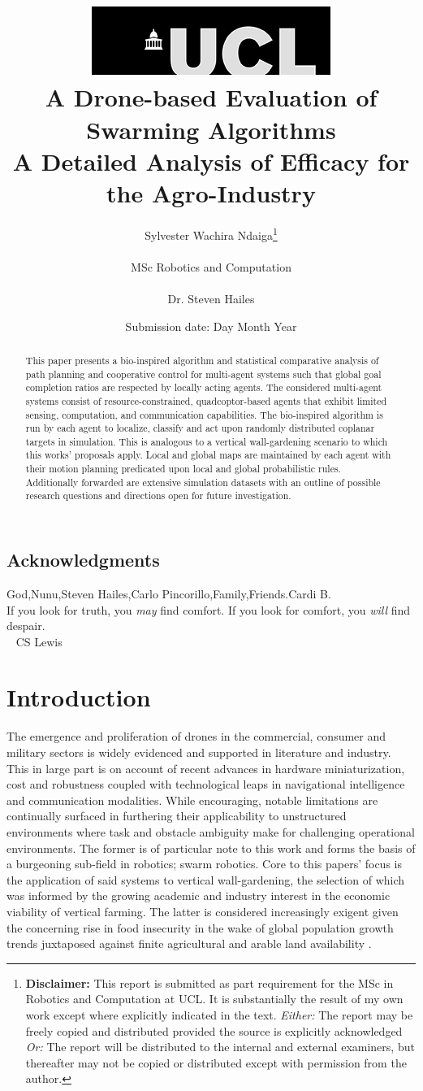 \documentclass{report}
\title{  	{ \includegraphics[scale=.5]{ucl_logo.png} }\\
{{\Huge A Drone-based Evaluation of Swarming Algorithms}}\\
{\large A Detailed Analysis of Efficacy for the Agro-Industry}\\
		}
\date{Submission date: Day Month Year}
\author{Sylvester Wachira Ndaiga\thanks{
{\bf Disclaimer:}
This report is submitted as part requirement for the MSc in Robotics and Computation at UCL. It is
substantially the result of my own work except where explicitly indicated in the text.
\emph{Either:} The report may be freely copied and distributed provided the source is explicitly acknowledged
\newline  %
\emph{Or:}\newline
The report will be distributed to the internal and external examiners, but thereafter may not be copied or distributed except with permission from the author.}
\\ \\
MSc Robotics and Computation\\ \\
Dr. Steven Hailes}
\begin{document}
 
\onehalfspacing
\maketitle
\begin{abstract}
This paper presents a bio-inspired algorithm and statistical comparative analysis of path planning and cooperative control for multi-agent systems such that global goal completion ratios are respected by locally acting agents. The considered multi-agent systems consist of resource-constrained, quadcoptor-based agents that exhibit limited sensing, computation, and communication capabilities. The bio-inspired algorithm is run by each agent to localize, classify and act upon randomly distributed coplanar targets in simulation. This is analogous to a vertical wall-gardening scenario to which this works' proposals apply. Local and global maps are maintained by each agent with their motion planning predicated upon local and global probabilistic rules. Additionally forwarded are extensive simulation datasets with an outline of possible research questions and directions open for future investigation.
\end{abstract}
\tableofcontents
\setcounter{page}{1}

\newpage
\section*{Acknowledgments}
God,Nunu,Steven Hailes,Carlo Pincorillo,Family,Friends.Cardi B.
\vspace{5cm}
\\
If you look for truth, you \textit{may} find comfort.
If you look for comfort, you \textit{will} find despair.
\\
~ CS Lewis

\chapter{Introduction}

The emergence and proliferation of drones in the commercial, consumer and military sectors is widely evidenced and supported in literature and industry. This in large part is on account of recent advances in hardware miniaturization, cost and robustness coupled with technological leaps in navigational intelligence and communication modalities. While encouraging, notable limitations are continually surfaced in furthering their applicability to unstructured environments where task and obstacle ambiguity make for challenging operational environments. The former is of particular note to this work and forms the basis of a burgeoning sub-field in robotics; swarm robotics. Core to this papers' focus is the application of said systems to vertical wall-gardening, the selection of which was informed by the growing academic and industry \cite{Gmi2017} interest in the economic viability of vertical farming. The latter is considered increasingly exigent given the concerning rise in food insecurity \cite{Yang2018} in the wake of global population growth trends juxtaposed against finite agricultural and arable land availability \cite{Banerjee2014}.
\end{document}
